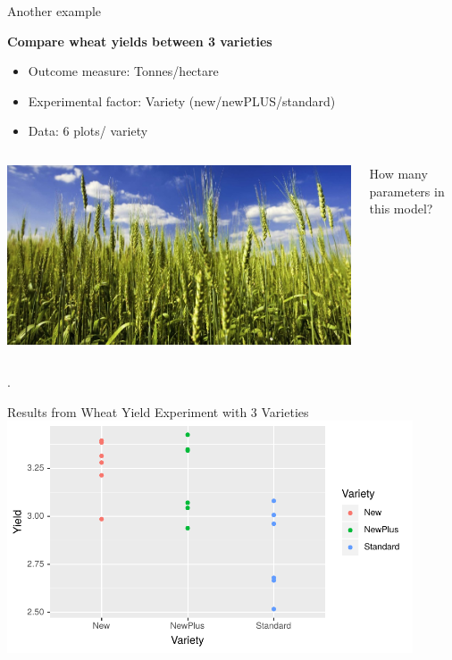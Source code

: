 \documentclass{beamer}
\begin{document}
\begin{frame}{Another example}

\begin{block}{\textbf{Compare wheat yields between 3 varieties}}
\begin{itemize}
  \item Outcome measure: Tonnes/hectare
  \item Experimental factor: Variety (new/newPLUS/standard)
  \item Data:  6 plots/ variety
\end{itemize}
\end{block}

\begin{columns}
 \begin{column}{0.5\textwidth}
  \includegraphics[width=\textwidth]{Figures/wheat}
 \end{column}
\begin{column}{0.5\textwidth}
    How many parameters in this model?
 \end{column}
\end{columns}

.
\end{frame}

\begin{frame}{Results from Wheat Yield Experiment with 3 Varieties}
 \includegraphics[width=0.9\textwidth]{Figures/wheatyield}
\end{frame}
\end{document}
